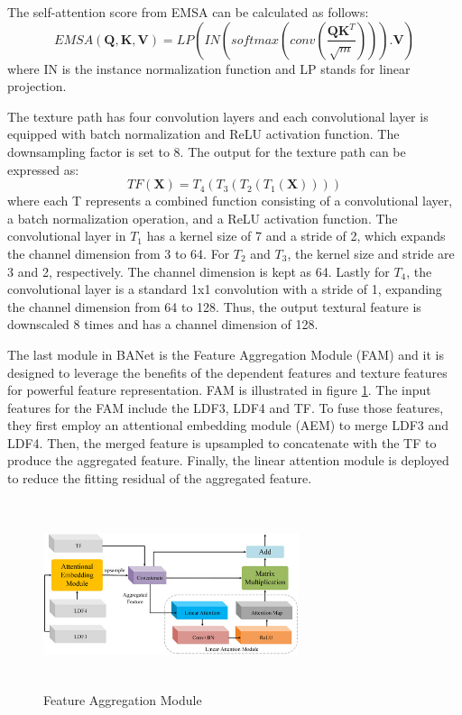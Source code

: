 The self-attention score from EMSA can be calculated as follows:
\begin{equation}
    EMSA(\mathbf{Q,K,V}) = LP(IN(softmax(conv(\frac{\mathbf{QK}^T}{\sqrt{m}}))).\mathbf{V})
\end{equation}
where IN is the instance normalization function and LP stands for linear projection.

The texture path has four convolution layers and each convolutional layer is equipped with batch normalization and ReLU activation function. The downsampling factor is set to 8. The output for the texture path can be expressed as:
\begin{equation}
    TF(\mathbf{X}) = T_4(T_3(T_2(T_1(\mathbf{X}))))
\end{equation}
where each T represents a combined function consisting of a convolutional layer, a batch
normalization operation, and a ReLU activation function. The convolutional layer in $T_1$ has a
kernel size of 7 and a stride of 2, which expands the channel dimension from 3 to 64. For
$T_2$ and $T_3$, the kernel size and stride are 3 and 2, respectively. The channel dimension is
kept as 64. Lastly for $T_4$, the convolutional layer is a standard 1x1 convolution with a stride of 1, expanding the channel dimension from 64 to 128. Thus, the output textural feature is
downscaled 8 times and has a channel dimension of 128.

The last module in BANet is the Feature Aggregation Module (FAM) and it is designed to leverage the benefits of the dependent features and texture features for powerful feature representation. FAM is illustrated in figure \ref{fig:fam}. The input features for the FAM include the LDF3, LDF4 and TF. To fuse those features, they first employ an attentional embedding module (AEM) to merge LDF3 and LDF4. Then, the merged feature is upsampled to concatenate with the TF to produce the aggregated feature. Finally, the linear attention module is deployed to reduce the fitting residual of the aggregated feature.

\FloatBarrier
\begin{figure}[ht]
\includegraphics[width=7.5cm, height=5.5cm]{images/fam.jpg}
\centering
\caption{Feature Aggregation Module \protect\cite{banet}}
\label{fig:fam}
\end{figure}


